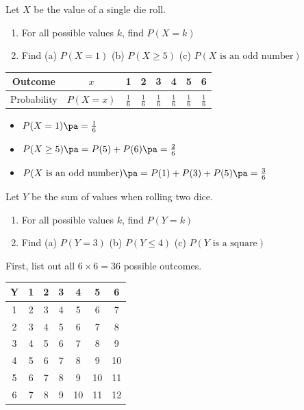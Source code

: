 \begin{frame}[t]
\begin{ex}
Let $X$ be the value of a single die roll. \pa
\begin{enumerate}
\item For all possible values $k$, find $P(X=k)$
\item Find (a) $P(X=1)$ (b) $P(X\geq 5)$ (c) $P(X \text{ is an odd number})$
\end{enumerate}
\end{ex}
\begin{sol}
\begin{table}[h!]
\begin{tabular}{c |c || c | c| c| c| c | c}
Outcome     & $x$    & 1 & 2  & 3   & 4    & 5    & 6   \\
\hline
Probability &$ P(X=x)$ & $\frac{1}{6}$ & $\frac{1}{6}$ & $\frac{1}{6}$ & $\frac{1}{6}$ & $\frac{1}{6}$ & $\frac{1}{6}$ 
\end{tabular}
\end{table}
\pa 
\begin{itemize}
\item $P(X=1) \pa = \frac{1}{6}$ \pa
\item $P(X \geq 5) \pa = P(5) + P(6) \pa = \frac{2}{6}$ \pa
\item $P(X \text{ is an odd number}) \pa = P(1) + P(3) + P(5) \pa = \frac{3}{6}$ \pa
\end{itemize}
\end{sol}
\end{frame}


\begin{frame}[t]
\begin{ex}
Let $Y$ be the sum of values when rolling two dice. \pause
\begin{enumerate}
\item For all possible values $k$, find $P(Y=k)$
\item Find (a) $P(Y=3)$ (b) $P(Y \leq 4)$ (c) $P(Y \text{ is a square})$
\end{enumerate}
\end{ex}
\begin{sol}
First, list out all $6 \times 6 = 36$ possible outcomes.
\begin{table}[h!]
\renewcommand{\arraystretch}{1.2}
\begin{tabular}{c||c|c|c|c|c|c}
Y & 1 & 2 & 3 & 4  & 5  & 6  \\
\hline
\hline
1                                & 2 & 3 & 4 & 5  & 6  & 7  \\
\hline
2                                & 3 & 4 & 5 & 6  & 7  & 8  \\
\hline
3                                & 4 & 5 & 6 & 7  & 8  & 9  \\
\hline
4                                & 5 & 6 & 7 & 8  & 9  & 10 \\
\hline
5                                & 6 & 7 & 8 & 9  & 10 & 11 \\
\hline
6                                & 7 & 8 & 9 & 10 & 11 & 12
\end{tabular}
\end{table}
\end{sol}
\end{frame}


